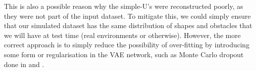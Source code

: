 This is also a possible reason why the simple-U's were reconstructed poorly, as they were not part of the input dataset. To mitigate this, we could simply ensure that our simulated dataset has the same distribution of shapes and obstacles that we will have at test time (real environments or otherwise). However, the more correct approach is to simply reduce the possibility of over-fitting by introducing some form or regularisation in the VAE network, such as Monte Carlo dropout done in \cite{dronet} and \cite{deepCollisionPredictorOracle}.



